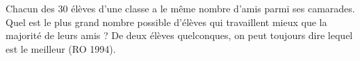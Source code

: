 Chacun des $30$ élèves d'une classe a le même nombre d'amis parmi ses camarades. Quel est le plus grand nombre possible d'élèves qui travaillent mieux que la majorité de leurs amis ? De deux élèves quelconques, on peut toujours dire lequel est le meilleur (RO 1994).
